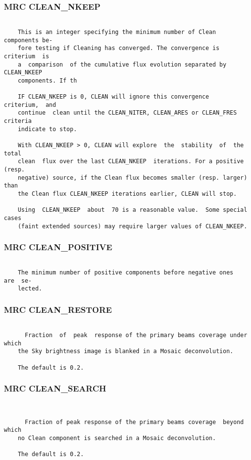 \subsubsection{MRC CLEAN\_NKEEP}
\begin{verbatim}

    This is an integer specifying the minimum number of Clean components be-
    fore testing if Cleaning has converged. The convergence is criterium  is
    a  comparison  of the cumulative flux evolution separated by CLEAN_NKEEP
    components. If th

    IF CLEAN_NKEEP is 0, CLEAN will ignore this convergence  criterium,  and
    continue  clean until the CLEAN_NITER, CLEAN_ARES or CLEAN_FRES criteria
    indicate to stop.

    With CLEAN_NKEEP > 0, CLEAN will explore  the  stability  of  the  total
    clean  flux over the last CLEAN_NKEEP  iterations. For a positive (resp.
    negative) source, if the Clean flux becomes smaller (resp. larger)  than
    the Clean flux CLEAN_NKEEP iterations earlier, CLEAN will stop.

    Using  CLEAN_NKEEP  about  70 is a reasonable value.  Some special cases
    (faint extended sources) may require larger values of CLEAN_NKEEP.

\end{verbatim}
\subsubsection{MRC CLEAN\_POSITIVE}
\begin{verbatim}

    The minimum number of positive components before negative ones  are  se-
    lected.

\end{verbatim}
\subsubsection{MRC CLEAN\_RESTORE}
\begin{verbatim}

      Fraction  of  peak  response of the primary beams coverage under which
    the Sky brightness image is blanked in a Mosaic deconvolution.

    The default is 0.2.

\end{verbatim}
\subsubsection{MRC CLEAN\_SEARCH}
\begin{verbatim}


      Fraction of peak response of the primary beams coverage  beyond  which
    no Clean component is searched in a Mosaic deconvolution.

    The default is 0.2.

\end{verbatim}
